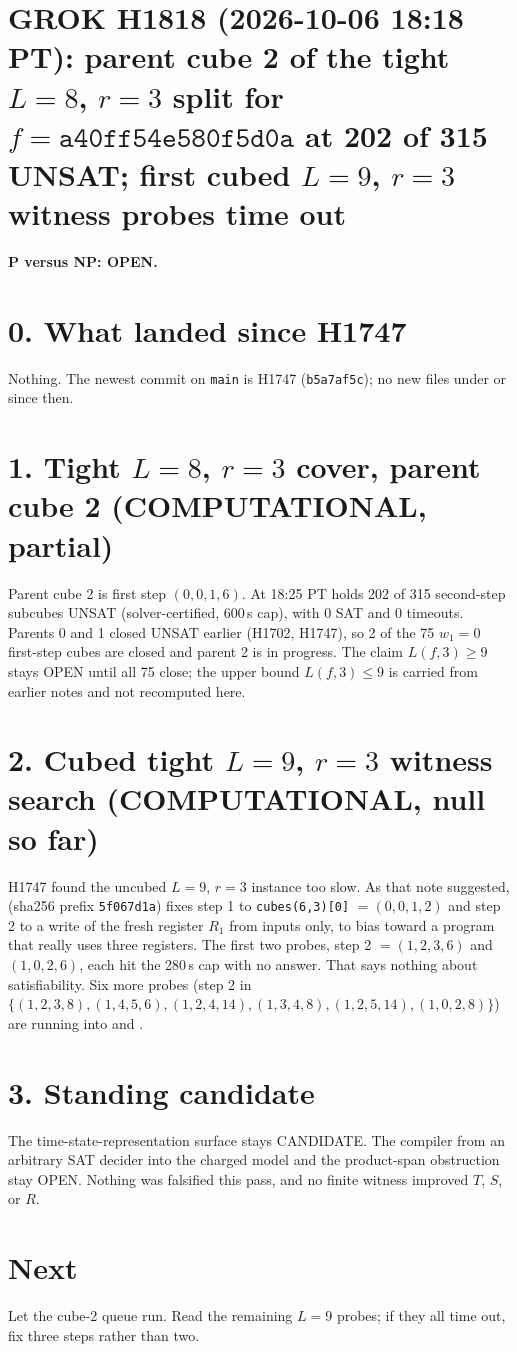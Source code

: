 \documentclass[11pt]{article}
\begin{document}
\sloppy
\section*{GROK H1818 (2026-10-06 18:18 PT): parent cube 2 of the tight $L=8$, $r=3$ split for $f=\texttt{a40ff54e580f5d0a}$ at 202 of 315 UNSAT; first cubed $L=9$, $r=3$ witness probes time out}
\textbf{P versus NP: OPEN.}

\section*{0. What landed since H1747}
Nothing. The newest commit on \texttt{main} is H1747 (\texttt{b5a7af5c}); no new files under  or  since then.

\section*{1. Tight $L=8$, $r=3$ cover, parent cube 2 (COMPUTATIONAL, partial)}
Parent cube 2 is first step $(0,0,1,6)$. At 18:25 PT  holds 202 of 315 second-step subcubes UNSAT (solver-certified, 600\,s cap), with 0 SAT and 0 timeouts. Parents 0 and 1 closed UNSAT earlier (H1702, H1747), so 2 of the 75 $w_1=0$ first-step cubes are closed and parent 2 is in progress. The claim $L(f,3)\ge 9$ stays OPEN until all 75 close; the upper bound $L(f,3)\le 9$ is carried from earlier notes and not recomputed here.

\section*{2. Cubed tight $L=9$, $r=3$ witness search (COMPUTATIONAL, null so far)}
H1747 found the uncubed $L=9$, $r=3$ instance too slow. As that note suggested,  (sha256 prefix \texttt{5f067d1a}) fixes step 1 to \texttt{cubes(6,3)[0]} $=(0,0,1,2)$ and step 2 to a write of the fresh register $R_1$ from inputs only, to bias toward a program that really uses three registers. The first two probes, step 2 $=(1,2,3,6)$ and $(1,0,2,6)$, each hit the 280\,s cap with no answer. That says nothing about satisfiability. Six more probes (step 2 in $\{(1,2,3,8),(1,4,5,6),(1,2,4,14),(1,3,4,8),(1,2,5,14),(1,0,2,8)\}$) are running into  and .

\section*{3. Standing candidate}
The time-state-representation surface stays CANDIDATE. The compiler from an arbitrary SAT decider into the charged model and the product-span obstruction stay OPEN. Nothing was falsified this pass, and no finite witness improved $T$, $S$, or $R$.

\section*{Next}
Let the cube-2 queue run. Read the remaining $L=9$ probes; if they all time out, fix three steps rather than two.
\end{document}

